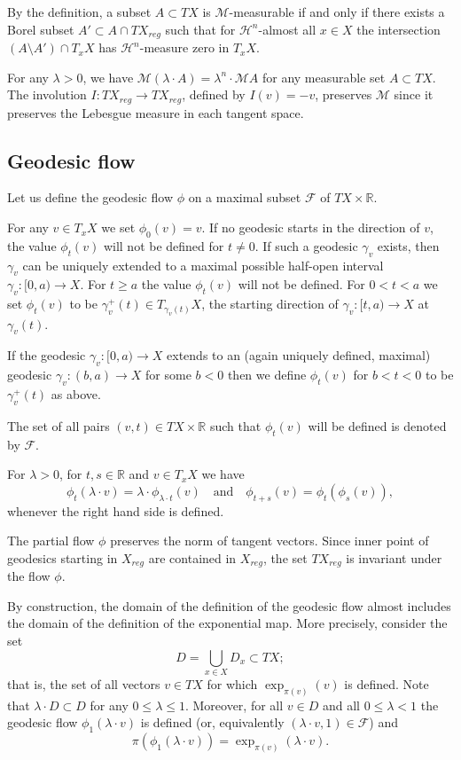 \documentclass[12pt,leqno,intlimits]{amsart}
\numberwithin{equation}{section}
\theoremstyle{definition}
\theoremstyle{remark}
\newcommand{\R}{\mathbb{R}}
\def\:{\colon}
\begin{document}
By the definition, a subset $A\subset TX$ is $\mathcal M$-measurable if and only if there exists a Borel subset $A'\subset A\cap TX_{reg}$ such that
for $\mathcal H^n$-almost all $x\in X$ the intersection $(A\setminus A') \cap T_xX$ has $\mathcal H^n$-measure zero in $T_xX$.

For any $\lambda>0$, we have $\mathcal M(\lambda\cdot A)=\lambda^n\cdot\mathcal MA$ for any measurable set $A\subset TX$.
The involution $I\:TX_{reg}\to TX_{reg}$, defined by $I(v)=-v$,
preserves $\mathcal M$
since it preserves the Lebesgue measure in each tangent space.


\subsection{Geodesic flow}
Let us define the geodesic flow $\phi$ on a maximal subset $\mathcal F$ of $TX\times\R$.

For any $v\in T_xX$ we set $\phi _0(v)=v$.
If no geodesic starts in the direction of $v$,
the value $\phi _t(v)$ will not be defined for $t\neq 0$. If such a geodesic $\gamma_v$ exists, then $\gamma_v$ can be uniquely extended to a maximal possible half-open interval $\gamma_v \:[0,a)\to X$. For $t\geq a$
the value $\phi _t(v)$ will not be defined. For $0<t<a$ we set $\phi _t(v)$ to be $\gamma _v ^+ (t) \in T_{\gamma _v(t)} X$, the starting direction of $\gamma_v\:[t,a) \to X$ at $\gamma_v (t)$.

If the geodesic $\gamma _v\:[0,a)\to X$ extends to an (again uniquely defined, maximal) geodesic $\gamma_v\:(b,a) \to X$ for some $b<0$
then we define $\phi _t(v)$ for $b<t<0$ to be $\gamma_v ^+ (t) $ as above.

The set of all pairs $(v,t)\in TX\times\R$ such that $\phi_t(v)$ will be defined is denoted by $\mathcal F$.

For $\lambda >0$, for $t,s\in \R$ and $v\in T_x X$ we have
$$\phi _t(\lambda \cdot v) =\lambda \cdot \phi _{\lambda \cdot t} (v)
\quad\text{and}\quad
\phi _{t+s} (v) =\phi _t ( \phi _s (v)),$$
whenever the right hand side is defined.

The partial flow $\phi$ preserves the norm of tangent vectors. Since inner point of geodesics starting in $X_{reg}$ are contained in $X_{reg}$, the set $TX_{reg}$ is invariant under the flow $\phi$.

By construction, the domain of the definition of the geodesic flow almost includes the domain of the definition of the exponential map.
More precisely, consider the set
\[D=\bigcup_{x\in X} D_x\subset TX;\]
that is, the set of all vectors $v\in TX$ for which $\exp _{\pi(v)} (v)$ is defined.
Note that $\lambda\cdot D\subset D$ for any $0\leq \lambda \leq 1$.
Moreover, for all $v\in D$ and all $0\leq \lambda <1$
the geodesic flow $\phi_1(\lambda\cdot v)$ is defined (or, equivalently $(\lambda\cdot v,1)\in \mathcal F$) and
\[\pi(\phi_1 (\lambda\cdot  v))= \exp _{\pi (v)} (\lambda\cdot  v).\]
\end{document}
